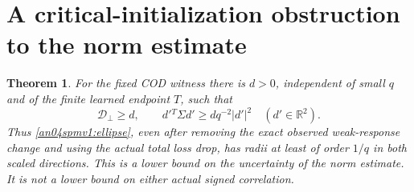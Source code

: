 \documentclass[11pt]{article}
\newtheorem{theorem}{Theorem}\newtheorem{lemma}{Lemma}
\begin{document}
\section{A critical-initialization obstruction to the norm estimate}
\begin{theorem}\label{an04spmv1:width}
For the fixed COD witness there is $d>0$, independent of small $q$
and of the finite learned endpoint $T$, such that
\[
 \mathcal D_\perp\ge d,\qquad
 d'{}^T\Sigma d'\ge d q^{-2}|d'|^2\quad(d'\in\mathbb R^2).
\]
Thus \eqref{an04spmv1:ellipse}, even after removing the exact
observed weak-response change and using the actual total loss drop,
has radii at least of order $1/q$ in both scaled directions.
This is a lower bound on the uncertainty of the norm estimate.
It is not a lower bound on either actual signed correlation.
\end{theorem}
\end{document}
